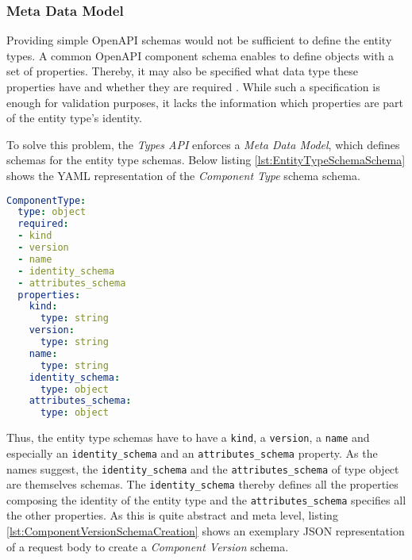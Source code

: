 \subsubsection{Meta Data Model} \label{sec:Meta Data Model}
Providing simple OpenAPI schemas would not be sufficient to define the entity types. A common OpenAPI component schema enables to define objects with a set of properties. Thereby, it may also be specified what data type these properties have and whether they are required \cite{OpenAPISpec}. While such a specification is enough for validation purposes, it lacks the information which properties are part of the entity type's identity.\par 
To solve this problem, the \emph{Types API} enforces a \emph{Meta Data Model}, which defines schemas for the entity type schemas. Below listing \ref{lst:EntityTypeSchemaSchema} shows the YAML representation of the \emph{Component Type} schema schema.\\

\begin{lstlisting}[language=yaml, caption=Entity Type Schema Schema, captionpos=b, label=lst:EntityTypeSchemaSchema]
ComponentType:
  type: object
  required:
  - kind
  - version
  - name
  - identity_schema
  - attributes_schema
  properties:
    kind: 
      type: string
    version:
      type: string
    name:
      type: string
    identity_schema:
      type: object
    attributes_schema:
      type: object
\end{lstlisting}

Thus, the entity type schemas have to have a \lstinline|kind|, a \lstinline|version|, a \lstinline|name| and especially an \lstinline|identity_schema| and an \lstinline|attributes_schema| property. As the names suggest, the \lstinline|identity_schema| and the \lstinline|attributes_schema| of type object are themselves schemas. The \lstinline|identity_schema| thereby defines all the properties composing the identity of the entity type and the \lstinline|attributes_schema| specifies all the other properties. As this is quite abstract and meta level, listing \ref{lst:ComponentVersionSchemaCreation} shows an exemplary JSON representation of a request body to create a \emph{Component Version} schema.\\ 


